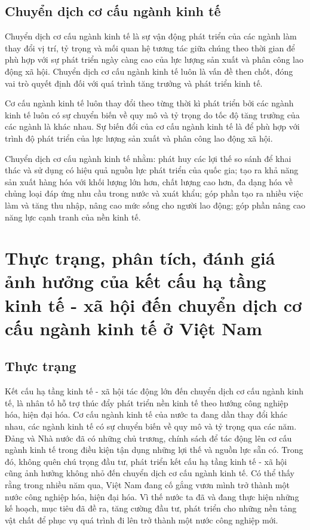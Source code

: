 \subsection{Chuyển dịch cơ cấu ngành kinh tế}
Chuyển dịch cơ cấu ngành kinh tế là sự vận động phát triển của các ngành làm thay đổi vị trí, tỷ trọng và mối quan hệ tương tác giữa chúng theo thời gian để phù hợp với sự phát triển ngày càng cao của lực lượng sản xuất và phân công lao động xã hội. Chuyển dịch cơ cấu ngành kinh tế luôn là vấn đề then chốt, đóng vai trò quyết định đối với quá trình tăng trưởng và phát triển kinh tế.

Cơ cấu ngành kinh tế luôn thay đổi theo từng thời kì phát triển bởi các ngành kinh tế luôn có sự chuyển biến về quy mô và tỷ trọng do tốc độ tăng trưởng của các ngành là khác nhau. Sự biến đổi của cơ cấu ngành kinh tế là để phù hợp với trình độ phát triển của lực lượng sản xuất và phân công lao động xã hội. 

Chuyển dịch cơ cấu ngành kinh tế nhằm: phát huy các lợi thế so sánh để khai thác và sử dụng có hiệu quả nguồn lực phát triển của quốc gia; tạo ra khả năng sản xuất hàng hóa với khối lượng lớn hơn, chất lượng cao hơn, đa dạng hóa về chủng loại đáp ứng nhu cầu trong nước và xuát khẩu; góp phần tạo ra nhiều việc làm và tăng thu nhập, nâng cao mức sống cho người lao động; góp phần nâng cao năng lực cạnh tranh của nền kinh tế.

\section[Thực trạng, phân tích, đánh giá]{Thực trạng, phân tích, đánh giá ảnh hưởng của kết cấu hạ tầng kinh tế - xã hội đến chuyển dịch cơ cấu ngành kinh tế ở Việt Nam}

\subsection{Thực trạng}
Kết cấu hạ tầng kinh tế - xã hội tác động lớn đến chuyển dịch cơ cấu ngành kinh tế, là nhân tố hỗ trợ thúc đẩy phát triển nền kinh tế theo hướng công nghiệp hóa, hiện đại hóa. Cơ cấu ngành kinh tế của nước ta đang dần thay đổi khác nhau, các ngành kinh tế có sự chuyển biến về quy mô và tỷ trọng qua các năm. Đảng và Nhà nước đã có những chủ trương, chính sách để tác động lên cơ cấu ngành kinh tế trong điều kiện tận dụng những lợi thế và nguồn lực sẵn có. Trong đó, không quên chú trọng đầu tư, phát triển kết cấu hạ tầng kinh tế - xã hội cũng ảnh hưởng không nhỏ đến chuyển dịch cơ cấu ngành kinh tế. Có thể thấy rằng trong nhiều năm qua, Việt Nam đang cố gắng vươn mình trở thành một nước công nghiệp hóa, hiện đại hóa. Vì thế nước ta đã và đang thực hiện những kế hoạch, mục tiêu đã đề ra, tăng cường đầu tư, phát triển cho những nền tảng vật chất để phục vụ quá trình đi lên trở thành một nước công nghiệp mới.

